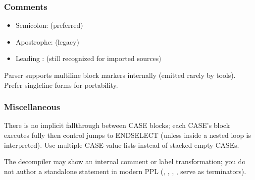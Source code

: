 \documentclass[letterpaper,10pt,english]{sphinxmanual}
\begin{document}
\subsubsection{Comments}
\label{\detokenize{ppl:comments}}\begin{description}
\begin{itemize}
\item {} 
\sphinxAtStartPar
Semicolon:  (preferred)

\item {} 
\sphinxAtStartPar
Apostrophe:  (legacy)

\item {} 
\sphinxAtStartPar
Leading \sphinxcode{\sphinxupquote{*}}:  (still recognized for imported sources)

\end{itemize}

\sphinxAtStartPar
Parser supports multi\sphinxhyphen{}line block markers internally (emitted rarely by tools). Prefer single\sphinxhyphen{}line forms for portability.

\end{description}


\subsubsection{Miscellaneous}
\label{\detokenize{ppl:miscellaneous}}\begin{description}
\sphinxAtStartPar
There is no implicit fall\sphinxhyphen{}through between CASE blocks; each CASE’s block executes fully then control jumps to ENDSELECT (unless  inside a nested loop is interpreted). Use multiple CASE value lists instead of stacked empty CASEs.

\sphinxAtStartPar
The decompiler may show an internal  comment or label transformation; you do not author a standalone  statement in modern PPL (, , , ,  serve as terminators).

\end{description}
\end{document}
